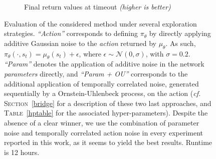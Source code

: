 \begin{figure}[H]
\begin{subfigure}[t]{0.49\textwidth}
    \caption{Final return values at timeout \textit{(higher is better)}}
  \end{subfigure}
  \caption{
  Evaluation of the considered method under several exploration strategies.
  \textit{``Action''} corresponds to defining $\pi_\theta$
  by directly applying additive Gaussian noise to the \emph{action} returned by $\mu_\theta$.
  As such,
  $\pi_\theta(\cdot, s_t) = \mu_\theta(s_t) + \epsilon$,
  where $\epsilon \sim \mathcal{N}(0,\sigma)$,
  with $\sigma=0.2$.
  \textit{``Param''} denotes the application of additive noise in the network \emph{parameters}
  directly, and
  \textit{``Param + OU''} corresponds to the additional application of temporally correlated
  noise, generated sequentially by a Ornstein-Uhlenbeck process, on the action
  (\textit{cf.} \textsc{Section}~\ref{bridge}
  for a description of these two last approaches,
  and \textsc{Table}~\ref{hptable} for the associated hyper-parameters).
  Despite the absence of a clear winner,
  we use the combination of parameter noise and temporally correlated action noise
  in every experiment reported in this work, as it seems to yield the best results.
  Runtime is 12 hours.}
\end{figure}

